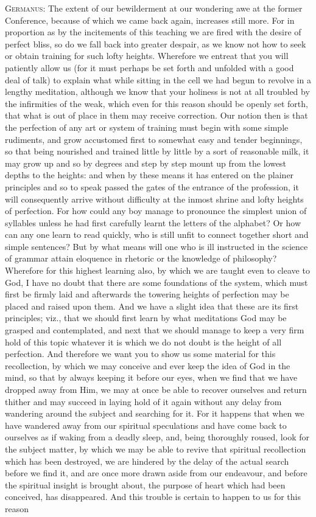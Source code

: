 \textsc{Germanus}: The extent of our bewilderment at our wondering awe at the former Conference, because of which we came back again, increases still more. For in proportion as by the incitements of this teaching we are fired with the desire of perfect bliss, so do we fall back into greater despair, as we know not how to seek or obtain training for such lofty heights. Wherefore we entreat that you will patiently allow us (for it must perhaps be set forth and unfolded with a good deal of talk) to explain what while sitting in the cell we had begun to revolve in a lengthy meditation, although we know that your holiness is not at all troubled by the infirmities of the weak, which even for this reason should be openly set forth, that what is out of place in them may receive correction. Our notion then is that the perfection of any art or system of training must begin with some simple rudiments, and grow accustomed first to somewhat easy and tender beginnings, so that being nourished and trained little by little by a sort of reasonable milk, it may grow up and so by degrees and step by step mount up from the lowest depths to the heights: and when by these means it has entered on the plainer principles and so to speak passed the gates of the entrance of the profession, it will consequently arrive without difficulty at the inmost shrine and lofty heights of perfection. For how could any boy manage to pronounce the simplest union of syllables unless he had first carefully learnt the letters of the alphabet? Or how can any one learn to read quickly, who is still unfit to connect together short and simple sentences? But by what means will one who is ill instructed in the science of grammar attain eloquence in rhetoric or the knowledge of philosophy? Wherefore for this highest learning also, by which we are taught even to cleave to God, I have no doubt that there are some foundations of the system, which must first be firmly laid and afterwards the towering heights of perfection may be placed and raised upon them. And we have a slight idea that these are its first principles; viz., that we should first learn by what meditations God may be grasped and contemplated, and next that we should manage to keep a very firm hold of this topic whatever it is which we do not doubt is the height of all perfection. And therefore we want you to show us some material for this recollection, by which we may conceive and ever keep the idea of God in the mind, so that by always keeping it before our eyes, when we find that we have dropped away from Him, we may at once be able to recover ourselves and return thither and may succeed in laying hold of it again without any delay from wandering around the subject and searching for it. For it happens that when we have wandered away from our spiritual speculations and have come back to ourselves as if waking from a deadly sleep, and, being thoroughly roused, look for the subject matter, by which we may be able to revive that spiritual recollection which has been destroyed, we are hindered by the delay of the actual search before we find it, and are once more drawn aside from our endeavour, and before the spiritual insight is brought about, the purpose of heart which had been conceived, has disappeared. And this trouble is certain to happen to us for this reason 